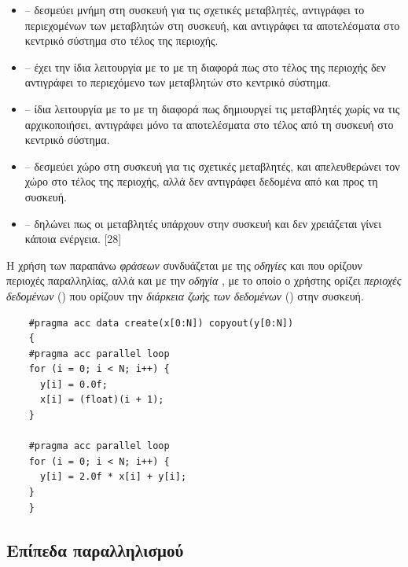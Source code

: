 \begin{itemize}
\item {} – δεσμεύει μνήμη στη συσκευή για τις σχετικές μεταβλητές, αντιγράφει το περιεχομένων των μεταβλητών στη συσκευή, και αντιγράφει τα αποτελέσματα στο κεντρικό σύστημα στο τέλος της περιοχής.
\item {} – έχει την ίδια λειτουργία με το  με τη διαφορά πως στο τέλος της περιοχής δεν αντιγράφει το περιεχόμενο των μεταβλητών στο κεντρικό σύστημα.
\item {} – ίδια λειτουργία με το  με τη διαφορά πως δημιουργεί τις μεταβλητές χωρίς να τις αρχικοποιήσει, αντιγράφει μόνο τα αποτελέσματα στο τέλος από τη συσκευή στο κεντρικό σύστημα.
\item {} – δεσμεύει χώρο στη συσκευή για τις σχετικές μεταβλητές, και απελευθερώνει τον χώρο στο τέλος της περιοχής, αλλά δεν αντιγράφει δεδομένα από και προς τη συσκευή.
\item {} – δηλώνει πως οι μεταβλητές υπάρχουν στην συσκευή και δεν χρειάζεται γίνει κάποια ενέργεια. [28]
\end{itemize}

Η χρήση των παραπάνω \textit{φράσεων} συνδυάζεται με της \textit{οδηγίες}  και  που ορίζουν περιοχές παραλληλίας, αλλά και με την \textit{οδηγία} , με το οποίο ο χρήστης ορίζει \textit{περιοχές δεδομένων} () που ορίζουν την \textit{διάρκεια ζωής των δεδομένων} () στην συσκευή.

\begin{center}
\begin{minipage}{0.5\textwidth}
\begin{verbatim}
    #pragma acc data create(x[0:N]) copyout(y[0:N])
    {
    #pragma acc parallel loop
    for (i = 0; i < N; i++) {
      y[i] = 0.0f;
      x[i] = (float)(i + 1);
    }
    
    #pragma acc parallel loop
    for (i = 0; i < N; i++) {
      y[i] = 2.0f * x[i] + y[i];
    }
    }
\end{verbatim}
\end{minipage}
\end{center}


\subsection{Επίπεδα παραλληλισμού}

